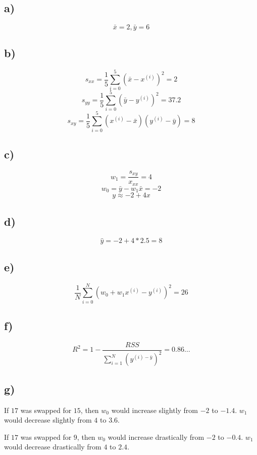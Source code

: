 \documentclass[11pt]{article}
\begin{document}
\section{}
\subsection{a)}
\[ \bar{x} = 2, \bar{y} = 6 \]

\subsection{b)}
\[ s_{xx} = \dfrac{1}{5}\sum\limits_{i=0}^{5} \left(\bar{x} - x^{(i)}\right)^2 = 2\]
\[ s_{yy} = \dfrac{1}{5}\sum\limits_{i=0}^{5} \left(\bar{y} - y^{(i)}\right)^2 = 37.2\]
\[ s_{xy} = \dfrac{1}{5}\sum\limits_{i=0}^{5} \left( x^{(i)} - \bar{x}\right) \left( y^{(i)} - \bar{y} \right) = 8\]

\subsection{c)}
\[ w_1 = \dfrac{s_{xy}}{x_{xx}} = 4\]
\[ w_0 = \bar{y}-w_1\bar{x} = -2 \]
\[ y \approx -2 + 4x \]

\subsection{d)}
\[ \hat{y} = -2 + 4*2.5 = 8 \]

\subsection{e)}
\[ \dfrac{1}{N} \sum\limits_{i=0}^{N} \left(w_0 + w_1x^{(i)} - y^{(i)}\right)^2 = 26 \]

\subsection{f)}
\[ R^2 = 1- \dfrac{RSS}{\sum\limits_{i=1}^{N} \left(y^{(i) - \bar{y}}\right)^2} = 0.86\ldots \]

\subsection{g)}
If $17$ was swapped for $15$, then $w_0$ would increase slightly from $-2$ to $-1.4$. $w_1$ would decrease slightly from $4$ to $3.6$.

If $ 17 $ was swapped for $ 9 $, then $w_0$ would increase drastically from $-2$ to $-0.4$. $w_1$ would decrease drastically from $4$ to $2.4$.
\newpage
\end{document}
